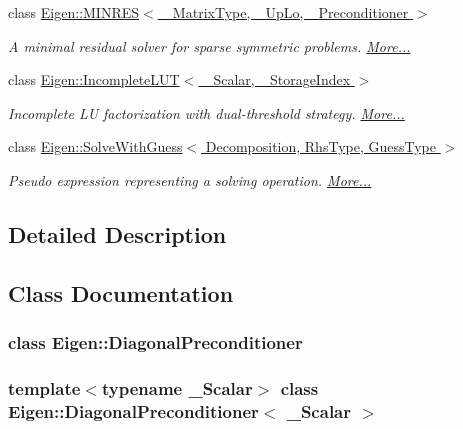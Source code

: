 \begin{DoxyCompactItemize}
class \hyperlink{group___iterative_linear_solvers___module_class_eigen_1_1_m_i_n_r_e_s}{Eigen\+::\+M\+I\+N\+R\+E\+S$<$ \+\_\+\+Matrix\+Type, \+\_\+\+Up\+Lo, \+\_\+\+Preconditioner $>$}
\begin{DoxyCompactList}\small\item\em A minimal residual solver for sparse symmetric problems.  \hyperlink{group___iterative_linear_solvers___module_class_eigen_1_1_m_i_n_r_e_s}{More...}\end{DoxyCompactList}\item 
class \hyperlink{group___iterative_linear_solvers___module_class_eigen_1_1_incomplete_l_u_t}{Eigen\+::\+Incomplete\+L\+U\+T$<$ \+\_\+\+Scalar, \+\_\+\+Storage\+Index $>$}
\begin{DoxyCompactList}\small\item\em Incomplete LU factorization with dual-\/threshold strategy.  \hyperlink{group___iterative_linear_solvers___module_class_eigen_1_1_incomplete_l_u_t}{More...}\end{DoxyCompactList}\item 
class \hyperlink{group___iterative_linear_solvers___module_class_eigen_1_1_solve_with_guess}{Eigen\+::\+Solve\+With\+Guess$<$ Decomposition, Rhs\+Type, Guess\+Type $>$}
\begin{DoxyCompactList}\small\item\em Pseudo expression representing a solving operation.  \hyperlink{group___iterative_linear_solvers___module_class_eigen_1_1_solve_with_guess}{More...}\end{DoxyCompactList}\end{DoxyCompactItemize}


\subsection{Detailed Description}


\subsection{Class Documentation}
\label{class_eigen_1_1_diagonal_preconditioner}
\subsubsection{class Eigen\+:\+:Diagonal\+Preconditioner}
\subsubsection*{template$<$typename \+\_\+\+Scalar$>$\newline
class Eigen\+::\+Diagonal\+Preconditioner$<$ \+\_\+\+Scalar $>$}

